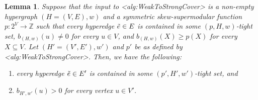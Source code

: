 \documentclass{article}
\def\Cref#1{<#1>}%
\newtheorem{lemma}{Lemma}[section]
\newcommand{\shubhang}[1]{{\color{blue}[{\tiny Shubhang: \bf #1}]\marginpar{\color{blue}*}}}
\newcommand{\knote}[1]{{\color{red}[{\tiny Karthik: \bf #1}]\marginpar{\color{red}*}}}
\newcommand{\maximalTightSetContainingHyperedge}[1]{\ensuremath{\tau_{#1}}\xspace}
\providecommand{\Z}{\mathbb{Z}}
\begin{document}
\begin{lemma}\label{lem:weak-to-strong-cover:next-recursive-call-hypothesis-satification:hyperedge-in-tight-set-positive-coverage}
Suppose that the input to \Cref{alg:WeakToStrongCover} is a non-empty hypergraph $(H = (V, E), w)$ and a symmetric skew-supermodular function $p:2^V\rightarrow \Z$ %
such that every hyperedge $\Tilde{e} \in E$ is contained in some $(p, H, w)$-tight set, $b_{(H,w)}(u) \not = 0$ for every $u \in V$, and $b_{(H,w)}(X) \geq p(X)$ for every $X \subseteq V$. 
Let $(H' = (V', E'), w')$ and $p'$ be as defined by \Cref{alg:WeakToStrongCover}. Then, we have the following:
\begin{enumerate}
    \item every hyperedge $\Tilde{e} \in E'$ is contained in some $(p', H', w')$-tight set, and
    \item  $b_{H',w'}(u) > 0$ for every vertex $u \in V'$.
\end{enumerate}
\end{lemma}
\end{document}
